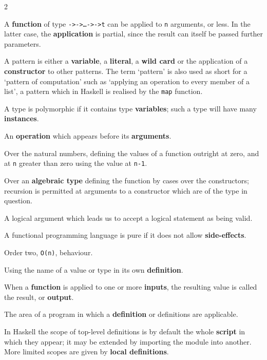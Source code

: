 \begin{multicols}{2}
{
A \textbf{function} of type \texttt{\tone->\ttwo->\ldots->\tn->t} can
be applied to \texttt{n} arguments, or less. In the latter case, the
\textbf{application} is partial, since the result can itself be passed further
parameters.

A pattern is either a \textbf{variable}, a \textbf{literal}, a \textbf{wild card}
or the application of a \textbf{constructor}
to other patterns. 
\itempar
The term `pattern' is also used as short for a `pattern of
computation' such as `applying an operation to every member of
a list', a pattern which in Haskell is realised by the
\texttt{map} function.

 
A type is polymorphic if it contains type \textbf{variables}; such a type will
have many \textbf{instances}.

An \textbf{operation} which appears before its \textbf{arguments}.

Over the natural numbers, defining the values of a function outright at zero,
and at \texttt{n} greater than zero using the value at \texttt{n-1}. 

\noindent
Over an \textbf{algebraic type}
defining the function by cases over the constructors; recursion is permitted
at arguments to a constructor which are of the type in question.

A logical argument which leads us to accept a logical statement as being
valid.

A functional programming
language is pure if it does not allow \textbf{side-effects}.

Order two, \texttt{O(n)}, behaviour.

Using the name of a value or type in its own \textbf{definition}.

When a \textbf{function} is applied to one or more \textbf{inputs}, the resulting
value is called the result, or \textbf{output}.

The area of a program in which a \textbf{definition} or definitions are
applicable. 

\noindent
In Haskell the scope of top-level definitions is by default the
whole \textbf{script} in which they appear; it may be extended by importing the
module into another.
More limited scopes are given by \textbf{local
definitions}.

}
\end{multicols}
